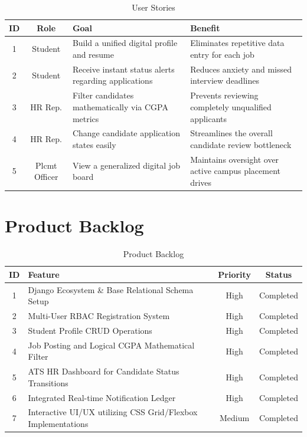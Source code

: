 \documentclass[a4paper,12pt]{report}
\begin{document}
\begin{table}[H]
\centering
\caption{User Stories}
\label{tab:userstory}
\renewcommand{\arraystretch}{1.3}
\begin{tabular}{|c|c|>{\centering\arraybackslash}p{5cm}|>{\centering\arraybackslash}p{5cm}|}
\hline
\textbf{ID} & \textbf{Role} & \textbf{Goal} & \textbf{Benefit} \\
\hline
1 & Student & Build a unified digital profile and resume & Eliminates repetitive data entry for each job \\
2 & Student & Receive instant status alerts regarding applications & Reduces anxiety and missed interview deadlines \\
3 & HR Rep. & Filter candidates mathematically via CGPA metrics & Prevents reviewing completely unqualified applicants \\
4 & HR Rep. & Change candidate application states easily & Streamlines the overall candidate review bottleneck \\
5 & Plcmt Officer & View a generalized digital job board & Maintains oversight over active campus placement drives \\
\hline
\end{tabular}
\end{table}

\section{Product Backlog}

\begin{table}[H]
\centering
\caption{Product Backlog}
\label{tab:backlog}
\renewcommand{\arraystretch}{1.3}
\begin{tabular}{|c|>{\centering\arraybackslash}p{8cm}|c|c|}
\hline
\textbf{ID} & \textbf{Feature} & \textbf{Priority} & \textbf{Status} \\
\hline
1 & Django Ecosystem \& Base Relational Schema Setup  & High   & Completed \\
2 & Multi-User RBAC Registration System        & High   & Completed \\
3 & Student Profile CRUD Operations              & High   & Completed \\
4 & Job Posting and Logical CGPA Mathematical Filter       & High   & Completed \\
5 & ATS HR Dashboard for Candidate Status Transitions             & High   & Completed \\
6 & Integrated Real-time Notification Ledger    & High   & Completed \\
7 & Interactive UI/UX utilizing CSS Grid/Flexbox Implementations               & Medium   & Completed \\
\hline
\end{tabular}
\end{table}
\end{document}
